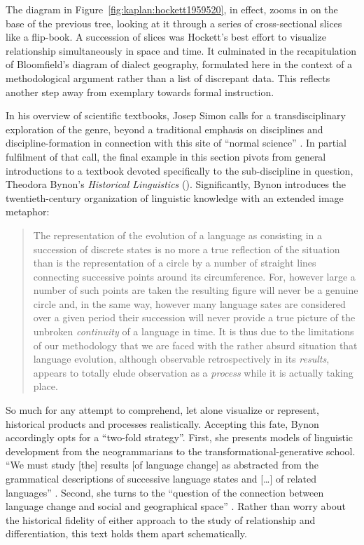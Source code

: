 \documentclass[output=paper]{langscibook}
\begin{document}
The diagram in Figure~\ref{fig:kaplan:hockett1959520}, in effect, zooms in on the base of the previous tree, looking at it through a series of cross-sectional slices like a flip-book. A succession of slices was Hockett's best effort to visualize relationship simultaneously in space and time. It culminated in the recapitulation of Bloomfield's diagram of dialect geography, formulated here in the context of a methodological argument rather than a list of discrepant data. This reflects another step away from exemplary towards formal instruction.

In his overview of scientific textbooks, Josep Simon calls for a transdisciplinary exploration of the genre, beyond a traditional emphasis on disciplines and discipline-formation in connection with this site of ``normal science'' \citep[475]{Simon2016}. In partial fulfilment of that call, the final example in this section pivots from general introductions to a textbook devoted specifically to the sub-discipline in question, Theodora Bynon's \emph{Historical Linguistics} (\citeyear{Bynon1977}). Significantly, Bynon introduces the twentieth-century organization of linguistic knowledge with an extended image metaphor:

\begin{quotation}
The representation of the evolution of a language as consisting in a succession of discrete states is no more a true reflection of the situation than is the representation of a circle by a number of straight lines connecting successive points around its circumference. For, however large a number of such points are taken the resulting figure will never be a genuine circle and, in the same way, however many language sates are considered over a given period their succession will never provide a true picture of the unbroken \emph{continuity} of a language in time. It is thus due to the limitations of our methodology that we are faced with the rather absurd situation that language evolution, although observable retrospectively in its \emph{results}, appears to totally elude observation as a \emph{process} while it is actually taking place. \citep[2]{Bynon1977}
\end{quotation}

So much for any attempt to comprehend, let alone visualize or represent, historical products and processes realistically. Accepting this fate, Bynon accordingly opts for a ``two-fold strategy''. First, she presents models of linguistic development from the neogrammarians to the transformational-generative school. ``We must study [the] results [of language change] as abstracted from the grammatical descriptions of successive language states and […] of related languages'' \citep[6]{Bynon1977}. Second, she turns to the ``question of the connection between language change and social and geographical space'' \citep[6]{Bynon1977}. Rather than worry about the historical fidelity of either approach to the study of relationship and differentiation, this text holds them apart schematically.
\end{document}
